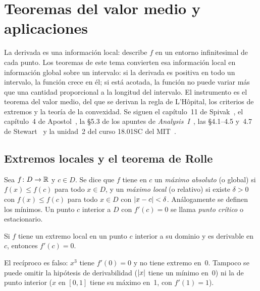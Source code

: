 \chapter{Teoremas del valor medio y aplicaciones}
\label{tema:5}

La derivada es una información local: describe $f$ en un entorno infinitesimal de cada punto. Los teoremas de este tema convierten esa información local en información global sobre un intervalo: si la derivada es positiva en todo un intervalo, la función crece en él; si está acotada, la función no puede variar más que una cantidad proporcional a la longitud del intervalo. El instrumento es el teorema del valor medio, del que se derivan la regla de L'Hôpital, los criterios de extremos y la teoría de la convexidad. Se siguen el capítulo~11 de Spivak~\cite{spivak}, el capítulo~4 de Apostol~\cite{apostol}, la §5.3 de los apuntes de \emph{Analysis~I}~\cite{cambA1}, las §4.1--4.5 y~4.7 de Stewart~\cite{stewart} y la unidad~2 del curso 18.01SC del MIT~\cite{mit1801}.

\section{Extremos locales y el teorema de Rolle}

\begin{definicion}[Extremos]\label{def:extremos}
Sea $f\colon D\to\mathbb{R}$ y $c\in D$. Se dice que $f$ tiene en $c$ un \emph{máximo absoluto} (o global) si $f(x)\le f(c)$ para todo $x\in D$, y un \emph{máximo local} (o relativo) si existe $\delta>0$ con $f(x)\le f(c)$ para todo $x\in D$ con $\lvert x-c\rvert<\delta$. Análogamente se definen los mínimos. Un punto $c$ interior a $D$ con $f'(c)=0$ se llama \emph{punto crítico} o estacionario.
\end{definicion}

\begin{teorema}\label{teo:fermat}
Si $f$ tiene un extremo local en un punto $c$ interior a su dominio y es derivable en $c$, entonces $f'(c)=0$.
\end{teorema}

El recíproco es falso: $x^{3}$ tiene $f'(0)=0$ y no tiene extremo en~0. Tampoco se puede omitir la hipótesis de derivabilidad ($\lvert x\rvert$ tiene un mínimo en~0) ni la de punto interior ($x$ en $[0,1]$ tiene su máximo en~1, con $f'(1)=1$).

